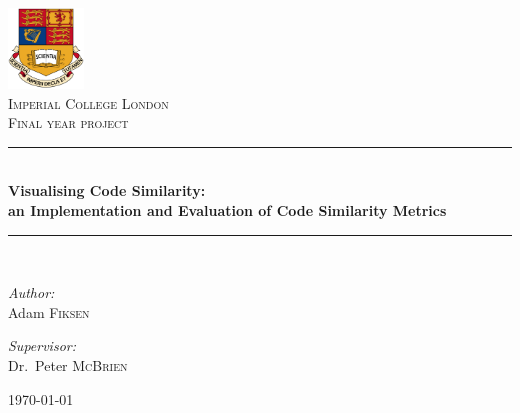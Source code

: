 \documentclass[a4paper, 11pt, twoside]{report}
\newcommand{\HRule}{\rule{\linewidth}{0.5mm}}
\begin{document}
\begin{titlepage}
\begin{center}

\includegraphics[width=0.15\textwidth]{Figures/logo}~\\[1cm]

\textsc{\LARGE Imperial College London}\\[1.5cm]

\textsc{\Large Final year project}\\[0.5cm]

\HRule \\[0.4cm]
{ \huge \bfseries Visualising Code Similarity: \\
an Implementation and Evaluation of Code Similarity Metrics\\[0.4cm] }

\HRule \\[1.5cm]

\begin{minipage}{0.4\textwidth}
\begin{flushleft} \large
\emph{Author:}\\
Adam \textsc{Fiksen}
\end{flushleft}
\end{minipage}
\begin{minipage}{0.4\textwidth}
\begin{flushright} \large
\emph{Supervisor:} \\
Dr.~Peter \textsc{McBrien}
\end{flushright}
\end{minipage}

\vfill

{\large \today}

\end{center}
\end{titlepage}

%
%

\tableofcontents



 






\end{document}
